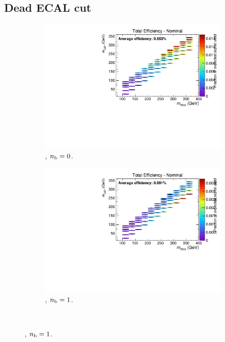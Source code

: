 \newpage
\subsection*{Dead ECAL cut}
\label{sec:t2cc_deadecal_plots}

\begin{figure}[h!]
  \centering
  \begin{subfigure}[b]{0.4\textwidth}
    \includegraphics[width=\textwidth, page=3]{Figs/sms/t2cc/v24/DeadECAL_T2cc_v24_eq0b_le3j_incl.pdf}
    \caption{\njlow, $n_{\text{b}} = 0$.}
  \end{subfigure}
  \begin{subfigure}[b]{0.4\textwidth}
    \includegraphics[width=\textwidth, page=3]{Figs/sms/t2cc/v24/DeadECAL_T2cc_v24_eq1b_le3j_incl.pdf}
    \caption{\njlow, $n_{\text{b}} = 1$.}
  \end{subfigure}\\

\end{figure}
